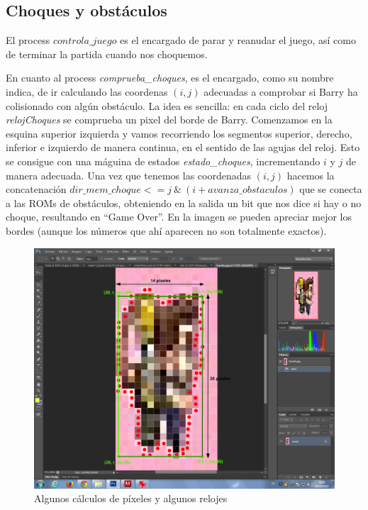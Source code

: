 \documentclass[11pt, a4paper, spanish, openright, twoside]{book}
\begin{document}
\subsection{Choques y obstáculos}

El process $controla\_juego$ es el encargado de parar y reanudar el juego, así como de terminar la partida cuando nos choquemos.

En cuanto al process \emph{comprueba\_choques}, es el encargado, como su nombre indica, de ir calculando las coordenas $(i, j)$ adecuadas a comprobar si Barry ha colisionado con algún obstáculo. La idea es sencilla: en cada ciclo del reloj \emph{relojChoques} se comprueba un pixel del borde de Barry. Comenzamos en la esquina superior izquierda y vamos recorriendo los segmentos superior, derecho, inferior e izquierdo de manera continua, en el sentido de las agujas del reloj. Esto se consigue con una máguina de estados \emph{estado\_choques}, incrementando $i$ y $j$ de manera adecuada. Una vez que tenemos las coordenadas $(i, j)$ hacemos la concatenación $dir\_mem\_choque <= j\ \&\ (i + avanza\_obstaculos)$ que se conecta a las ROMs de obstáculos, obteniendo en la salida un bit que nos dice si hay o no choque, resultando en ``Game Over''. En la imagen se pueden apreciar mejor los bordes (aunque los números que ahí aparecen no son totalmente exactos).


	\begin{figure}[!h]
		\centering
		\includegraphics[scale=0.33]{barryMedidas.png}
		\caption{Algunos cálculos de píxeles y algunos relojes}
	\end{figure}
\end{document}
